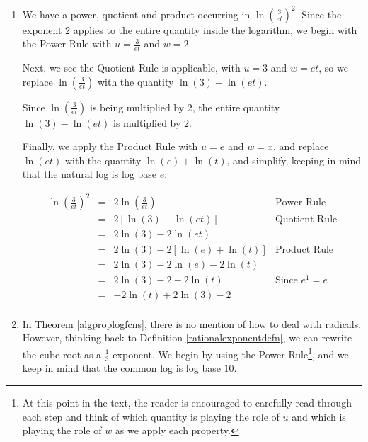 \documentclass{ximera}
\begin{document}
\begin{example}
\begin{explanation}
\begin{enumerate}
\[ \begin{array}{rclr}
\log_{0.1} \left(10 x^2 \right) & = &  \log_{0.1} (10) +  \log_{0.1} \left(x^2 \right) & \text{Product Rule} \\
& = &  \log_{0.1} (10)+ 2 \log_{0.1} (x) & \text{Power Rule} \\
& = &  -1 + 2 \log_{0.1} (x) & \text{Since $(0.1)^{-1} = 10$} \\
 & = &  2 \log_{0.1} (x) - 1 & \\
 \end{array}\]



\item  We have a power, quotient and product occurring in $\ln \left(\frac{3}{et}\right)^2$.  Since the exponent $2$ applies to the entire quantity inside the logarithm, we begin with the Power Rule with $u=\frac{3}{et}$ and $w = 2$.  

Next, we see the Quotient Rule is applicable, with $u=3$ and $w=et$, so we replace $\ln\left(\frac{3}{et}\right)$  with the quantity $\ln(3) - \ln(et)$. 

Since $\ln \left(\frac{3}{et}\right)$ is being multiplied by $2$, the entire quantity $\ln(3) - \ln(et)$ is multiplied by $2$.  

Finally, we apply the Product Rule with $u=e$ and $w=x$, and replace $\ln(et)$ with the quantity $\ln(e) + \ln(t)$, and simplify, keeping in mind that the natural log is log base $e$.


\[ \begin{array}{rclr}

\ln \left(\frac{3}{et}\right)^2 & = & 2 \ln \left(\frac{3}{et}\right) & \text{Power Rule} \\
& = & 2 \left[ \ln(3) - \ln(et) \right] & \text{Quotient Rule} \\
& = & 2 \ln(3) - 2\ln(et) & \\
& = & 2 \ln(3) - 2\left[\ln(e) + \ln(t)\right] & \text{Product Rule} \\
& = & 2 \ln(3) - 2\ln(e) - 2 \ln(t) & \\
& = & 2\ln(3) - 2 - 2 \ln(t) & \text{Since $e^{1} = e$} \\
& = & - 2 \ln(t) + 2\ln(3) - 2 & \\
\end{array}\]

                        

\item In Theorem \ref{algproplogfcns}, there is no mention of how to deal with radicals.  However, thinking back to Definition \ref{rationalexponentdefn}, we can rewrite the cube root as a $\frac{1}{3}$ exponent.  We begin by using the Power Rule\footnote{At this point in the text, the reader is encouraged to carefully read through each step and think of which quantity is playing the role of $u$ and which is playing the role of $w$ as we apply each property.}, and we keep in mind that the common log is log base $10$. 


\end{enumerate}
\end{explanation}
\end{example}
\end{document}
